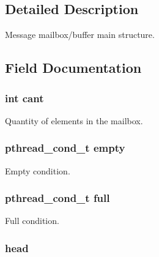 \subsection{Detailed Description}
Message mailbox/buffer main structure. 

\subsection{Field Documentation}
\subsubsection[{\texorpdfstring{cant}{cant}}]{\setlength{\rightskip}{0pt plus 5cm}int cant}\hypertarget{struct_m_s_g_b_u_f_f_a8abe07631df9645f55b4aae910bb730c}{}\label{struct_m_s_g_b_u_f_f_a8abe07631df9645f55b4aae910bb730c}


Quantity of elements in the mailbox. 

\subsubsection[{\texorpdfstring{empty}{empty}}]{\setlength{\rightskip}{0pt plus 5cm}pthread\+\_\+cond\+\_\+t empty}\hypertarget{struct_m_s_g_b_u_f_f_a736beea42a8a4cd01d723ac7790253f0}{}\label{struct_m_s_g_b_u_f_f_a736beea42a8a4cd01d723ac7790253f0}


Empty condition. 

\subsubsection[{\texorpdfstring{full}{full}}]{\setlength{\rightskip}{0pt plus 5cm}pthread\+\_\+cond\+\_\+t full}\hypertarget{struct_m_s_g_b_u_f_f_a3bf358e63dc2dbedca74be50f9e99dc4}{}\label{struct_m_s_g_b_u_f_f_a3bf358e63dc2dbedca74be50f9e99dc4}


Full condition. 

\subsubsection[{\texorpdfstring{head}{head}}]{ head}\hypertarget{struct_m_s_g_b_u_f_f_a0b589796ab43a65a825d58e006fd86dd}{}\label{struct_m_s_g_b_u_f_f_a0b589796ab43a65a825d58e006fd86dd}


